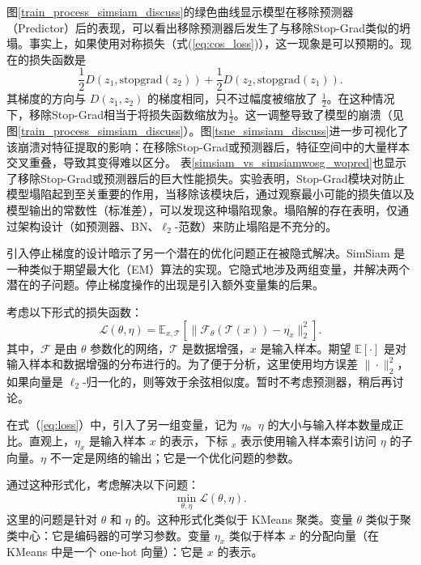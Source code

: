\documentclass[master]{thesis-uestc}
\begin{document}
图\ref{train_process_simsiam_discuss}的绿色曲线显示模型在移除预测器（Predictor）后的表现，可以看出移除预测器后发生了与移除Stop-Grad类似的坍塌。事实上，如果使用对称损失（式(\ref{eq:cos_loss})），这一现象是可以预期的。现在的损失函数是
\begin{equation}
    \frac{1}{2}D(z_1, \text{stopgrad}(z_2)) + \frac{1}{2}D(z_2, \text{stopgrad}(z_1)).
\end{equation}
其梯度的方向与 $D(z_1, z_2)$ 的梯度相同，只不过幅度被缩放了 $\frac{1}{2}$。在这种情况下，移除Stop-Grad相当于将损失函数缩放为$\frac{1}{2}$。这一调整导致了模型的崩溃（见图\ref{train_process_simsiam_discuss}）。图\ref{tsne_simsiam_discuss}进一步可视化了该崩溃对特征提取的影响：在移除Stop-Grad或预测器后，特征空间中的大量样本交叉重叠，导致其变得难以区分。
表\ref{simsiam_vs_simsiamwosg_wopred}也显示了移除Stop-Grad或预测器后的巨大性能损失。实验表明，Stop-Grad模块对防止模型塌陷起到至关重要的作用，当移除该模块后，通过观察最小可能的损失值以及模型输出的常数性（标准差），可以发现这种塌陷现象。塌陷解的存在表明，仅通过架构设计（如预测器、BN、$\ell_{2}$-范数）来防止塌陷是不充分的。

引入停止梯度的设计暗示了另一个潜在的优化问题正在被隐式解决。SimSiam 是一种类似于期望最大化（EM）算法的实现。它隐式地涉及两组变量，并解决两个潜在的子问题。停止梯度操作的出现是引入额外变量集的后果。

考虑以下形式的损失函数：
\begin{equation}
\label{eq:loss}
\mathcal{L}(\theta,\eta)=\mathbb{E}_{x,\mathcal{T}}\left[\|\mathcal{F}_{\theta} (\mathcal{T}(x))-\eta_{x}\|^{2}_{2}\right].
\end{equation}
其中，$\mathcal{F}$ 是由 $\theta$ 参数化的网络，$\mathcal{T}$ 是数据增强，$x$ 是输入样本。期望 $\mathbb{E}[\cdot]$ 是对输入样本和数据增强的分布进行的。为了便于分析，这里使用均方误差 $\|\cdot\|^{2}_{2}$，如果向量是 $\ell_{2}$-归一化的，则等效于余弦相似度。暂时不考虑预测器，稍后再讨论。

在式（\ref{eq:loss}）中，引入了另一组变量，记为 $\eta$。$\eta$ 的大小与输入样本数量成正比。直观上，$\eta_{x}$ 是输入样本 $x$ 的表示，下标 ${}_{x}$ 表示使用输入样本索引访问 $\eta$ 的子向量。$\eta$ 不一定是网络的输出；它是一个优化问题的参数。

通过这种形式化，考虑解决以下问题：
\begin{equation}
\label{eq:min_loss}
\min_{\theta,\eta}\mathcal{L}(\theta,\eta).
\end{equation}
这里的问题是针对 $\theta$ 和 $\eta$ 的。这种形式化类似于 KMeans 聚类。变量 $\theta$ 类似于聚类中心：它是编码器的可学习参数。变量 $\eta_{x}$ 类似于样本 $x$ 的分配向量（在 KMeans 中是一个 one-hot 向量）：它是 $x$ 的表示。
\end{document}
